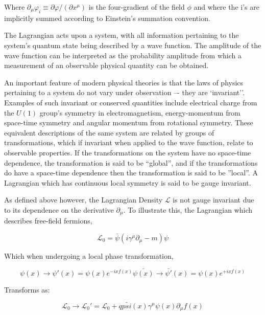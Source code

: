 Where $\partial _{\mu}\varphi_{i} \equiv \partial \varphi / (\partial x^{\mu} )$ is the four-gradient of the field $\phi$ and where the i's are implicitly summed according to Einstein's summation convention\cite{ElectroweakStrong}.

The Lagrangian acts upon a system, with all information pertaining to the system's quantum state being described by a wave function. 
The amplitude of the wave function can be interpreted as the probability amplitude from which a measurement of an observable physical quantity can be obtained\cite{Isham}. 

An important feature of modern physical theories is that the laws of physics pertaining to a system do not vary under observation –- they are `invariant''. 
Examples of such invariant or conserved quantities include electrical charge from the $U(1)$ group’s symmetry in electromagnetism, energy-momentum from space-time symmetry and angular momentum from rotational symmetry\cite{Haywood}. 
These equivalent descriptions of the same system are related by groups of transformations, which if invariant when applied to the wave function, relate to observable properties\cite{QFT}. 
If the transformations on the system have no space-time dependence, the transformation is said to be ``global'', and if the transformations do have a space-time dependence then the transformation is said to be ''local''. 
A Lagrangian which has continuous local symmetry is said to be gauge invariant\cite{Haywood}. 

As defined above however, the Lagrangian Density $\mathcal{L}$ is not gauge invariant due to its dependence on the derivative $\partial _{\mu}$. To illustrate this, the Lagrangian which describes free-field fermions\cite{QFT}, 

\begin{equation}
\mathcal{L}_{0} = \bar{\psi}(i\gamma^{\mu}\partial_{\mu} - m)\psi
\end{equation}

Which when undergoing a local phase transformation,

\begin{equation}
\psi(x) \rightarrow \psi'(x) = \psi(x)e^{-ixf(x)}
\bar{\psi(x)} \rightarrow \bar{\psi'}(x) = \psi(x)e^{+ixf(x)}
\end{equation}

Transforms as:

\begin{equation}
\mathcal{L}_{0} \rightarrow \mathcal{L}_{0}' = \mathcal{L}_{0} + q \bar{psi}(x)\gamma^{\mu}\psi(x)\partial_{\mu}f(x)
\end{equation}

